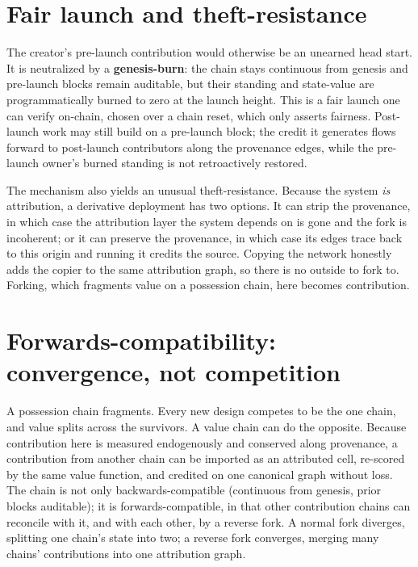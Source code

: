 \documentclass[10pt]{article}
\begin{document}
\section{Fair launch and theft-resistance}\label{sec:fairlaunch}

The creator's pre-launch contribution would otherwise be an unearned head start. It is neutralized by
a \textbf{genesis-burn}: the chain stays continuous from genesis and pre-launch blocks remain
auditable, but their standing and state-value are programmatically burned to zero at the launch height.
This is a fair launch one can verify on-chain, chosen over a chain reset, which only asserts fairness.
Post-launch work may still build on a pre-launch block; the credit it generates flows forward to
post-launch contributors along the provenance edges, while the pre-launch owner's burned standing is
not retroactively restored.

The mechanism also yields an unusual theft-resistance. Because the system \emph{is} attribution, a
derivative deployment has two options. It can strip the provenance, in which case the attribution layer
the system depends on is gone and the fork is incoherent; or it can preserve the provenance, in which
case its edges trace back to this origin and running it credits the source. Copying the network
honestly adds the copier to the same attribution graph, so there is no outside to fork to. Forking,
which fragments value on a possession chain, here becomes contribution.

\section{Forwards-compatibility: convergence, not competition}

A possession chain fragments. Every new design competes to be the one chain, and value splits across the
survivors. A value chain can do the opposite. Because contribution here is measured endogenously and
conserved along provenance, a contribution from another chain can be imported as an attributed cell,
re-scored by the same value function, and credited on one canonical graph without loss. The chain is not
only backwards-compatible (continuous from genesis, prior blocks auditable); it is forwards-compatible,
in that other contribution chains can reconcile with it, and with each other, by a reverse fork. A normal fork diverges, splitting
one chain's state into two; a reverse fork converges, merging many chains' contributions into one
attribution graph.
\end{document}

